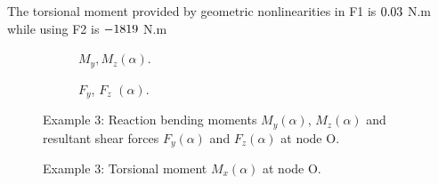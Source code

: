 \documentclass[3p,a4paper,11pt,review]{elsarticle}
\begin{document}
The torsional moment provided by geometric nonlinearities in F1 is $0.03$ N.m while using F2 is $-1819$ N.m


\begin{figure}[htb]
	\begin{subfigure}{.5\textwidth}
		\centering
		\resizebox{.9\textwidth}{!}{}		
		\caption{$M_y, M_z(\alpha)$.}
		\label{fig:BladeCantMYMZStatic}
	\end{subfigure}
	\begin{subfigure}{0.5\textwidth}
		\centering
		\resizebox{.9\textwidth}{!}{}		
		\caption{$F_y$, $F_z$ $(\alpha)$.}
		\label{fig:BladeCantForcesStatic}
	\end{subfigure}
	\caption{Example 3: Reaction bending moments $M_y(\alpha)$, $M_z(\alpha)$ and resultant shear forces $F_y(\alpha)$ and $F_z(\alpha)$ at node O.}
	\label{fig:BladeCantStaticBending}
\end{figure}

\begin{figure}[htb]
	\centering
	\resizebox{.45\textwidth}{!}{}
	\caption{Example 3: Torsional moment $M_x(\alpha)$ at node O.}
	\label{fig:BladeCantMXStatic}
\end{figure}
\end{document}
